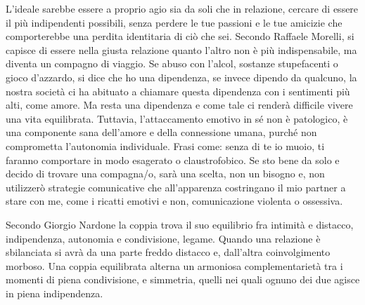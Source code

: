 \documentclass[12pt]{book} %
\begin{document}
L'ideale sarebbe essere a proprio agio sia da soli che in relazione, cercare di essere il più indipendenti possibili, senza perdere le tue passioni e le tue amicizie che comporterebbe una perdita identitaria di ciò che sei. 
Secondo Raffaele Morelli, si capisce di essere nella giusta relazione quanto
l'altro non è più indispensabile, ma diventa un compagno di
viaggio. Se abuso con l'alcol, sostanze stupefacenti o
gioco d'azzardo, si dice che ho una dipendenza, se invece dipendo da qualcuno, la nostra società ci ha abituato a chiamare questa dipendenza con i sentimenti più alti, come amore. Ma resta una dipendenza e come tale ci renderà difficile vivere una vita equilibrata. 
Tuttavia, l’attaccamento emotivo in sé non è patologico, è una componente sana dell’amore e della connessione umana, purché non comprometta l’autonomia individuale.
Frasi come: senza di te io muoio, ti faranno comportare in modo esagerato o claustrofobico. Se sto bene da solo e decido di trovare una
compagna/o, sarà una scelta, non un bisogno e, non utilizzerò strategie comunicative che
all'apparenza costringano il mio partner a stare con me, come i ricatti emotivi e non, comunicazione violenta o ossessiva.

Secondo Giorgio Nardone la coppia trova il suo equilibrio fra intimità e distacco, indipendenza, autonomia e condivisione,
legame. Quando una relazione è sbilanciata si avrà da una parte freddo distacco e, dall'altra
coinvolgimento morboso. Una coppia equilibrata alterna un armoniosa complementarietà tra i momenti di piena
condivisione, e simmetria, quelli nei quali ognuno dei due agisce in piena indipendenza. 
\end{document}
